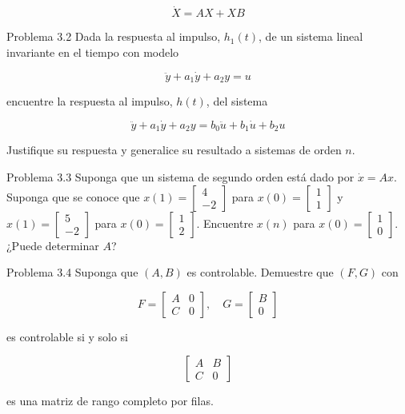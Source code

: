 $$
\dot{X}=A X+X B
$$

Problema 3.2 Dada la respuesta al impulso, $h_{1}(t)$, de un sistema lineal invariante en el tiempo con modelo

$$
\ddot{y}+a_{1} \dot{y}+a_{2} y=u
$$

encuentre la respuesta al impulso, $h(t)$, del sistema

$$
\ddot{y}+a_{1} \dot{y}+a_{2} y=b_{0} \ddot{u}+b_{1} \dot{u}+b_{2} u
$$

Justifique su respuesta y generalice su resultado a sistemas de orden $n$.

Problema 3.3 Suponga que un sistema de segundo orden está dado por $\dot{x}=A x$. Suponga que se conoce que $x(1)=\left[\begin{array}{c}4 \\ -2\end{array}\right]$ para $x(0)=\left[\begin{array}{l}1 \\ 1\end{array}\right]$ y $x(1)=\left[\begin{array}{c}5 \\ -2\end{array}\right]$ para $x(0)=\left[\begin{array}{l}1 \\ 2\end{array}\right]$. Encuentre $x(n)$ para $x(0)=\left[\begin{array}{l}1 \\ 0\end{array}\right]$. ¿Puede determinar $A$?

Problema 3.4 Suponga que $(A, B)$ es controlable. Demuestre que $(F, G)$ con

$$
F=\left[\begin{array}{ll}
A & 0 \\
C & 0
\end{array}\right], \quad G=\left[\begin{array}{l}
B \\
0
\end{array}\right]
$$

es controlable si y solo si

$$
\left[\begin{array}{ll}
A & B \\
C & 0
\end{array}\right]
$$

es una matriz de rango completo por filas.

